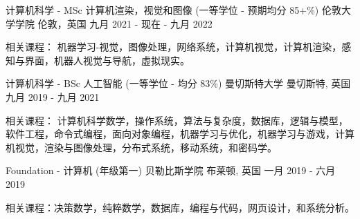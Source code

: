 

\begin{cventries}

  \cventry
    {计算机科学 - MSc 计算机渲染，视觉和图像 (一等学位 - 预期均分 85+\%)} %
    {伦敦大学学院} %
    {伦敦，英国} %
    {九月 2021 - 现在 - 九月 2022} %
    {
      \begin{cvitems} %
        \item {相关课程： 机器学习-视觉，图像处理，网络系统，计算机视觉，计算机渲染，感知与界面，机器人视觉与导航，虚拟现实。}
      \end{cvitems}
    }
    
  \cventry
    {计算机科学 - BSc 人工智能 (一等学位 - 均分 83\%)} %
    {曼切斯特大学} %
    {曼切斯特, 英国} %
    {九月 2019 - 九月 2021} %
    {
      \begin{cvitems} %
        \item {相关课程： 计算机科学数学，操作系统，算法与复杂度，数据库，逻辑与模型，软件工程，命令式编程，面向对象编程，机器学习与优化，机器学习与游戏，计算机视觉，渲染与图像处理，分布式系统，移动系统，和密码学。}
      \end{cvitems}
    }
    
    \cventry
    {Foundation - 计算机 (年级第一)} %
    {贝勒比斯学院} %
    {布莱顿, 英国} %
    {一月 2019 - 六月 2019} %
    {
     \begin{cvitems} %
        \item {相关课程：决策数学，纯粹数学，数据库，编程与代码，网页设计，和系统分析。}
      \end{cvitems}
    }
    

\end{cventries}
